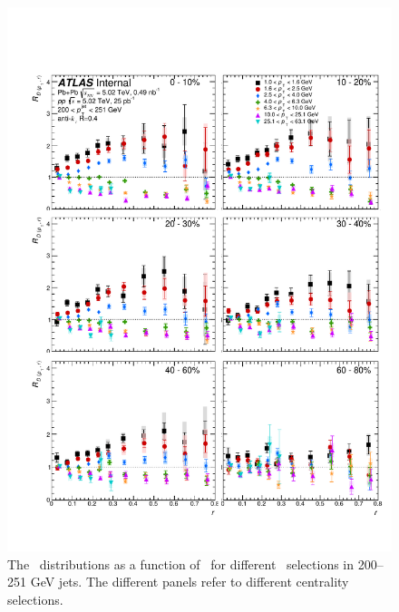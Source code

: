 \begin{figure}[h]
\includegraphics[width=1.0\textwidth]{figures/results/RDpT_dR_jet9}
\caption{The \RDptr\ distributions as a function of \rvar\ for different \pt\ selections in 200--251 GeV jets.
The different panels refer to different centrality selections.}
\label{fig:fullset_rptr_j9}
\end{figure}

